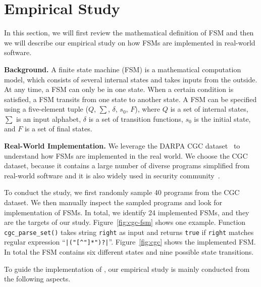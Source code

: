 \section{Empirical Study}
\label{sec:study}
In this section, we will first review the mathematical definition of FSM and then
we will describe our empirical study on how FSMs are implemented 
in real-world software. 

\noindent\textbf{Background.}
A finite state machine (FSM) is a mathematical computation model, 
which consists of several internal states and takes inputs from the outside.
At any time, a FSM can only be in one state. 
When a certain condition is satisfied, 
a FSM transits from one state to another state. 
A FSM can be specified using a five-element tuple ($Q$, $\sum$, $\delta$, $s_0$, $F$),
where $Q$ is a set of internal states, $\sum$ is an input alphabet, 
$\delta$ is a set of transition functions,
$s_0$ is the initial state, and $F$ is a set of final states. 

\noindent\textbf{Real-World Implementation.}
We leverage the DARPA CGC dataset~\cite{CGC} to 
understand how FSMs are implemented in the real world. 
We choose the CGC dataset, because it 
contains a large number of diverse programs simplified 
from real-world software and it 
is also widely used in security 
community~\cite{QSYM, Driller, VUzzer}. 


To conduct the study, we first randomly sample 
40 programs from the CGC dataset.
We then manually inspect the sampled programs and look for implementation of FSMs.
In total, we identify 24 implemented FSMs, 
and they are the targets of our study.
Figure~\ref{fig:cgc-fsm} shows one example.
Function \texttt{cgc\_parse\_set()} takes string \texttt{right} 
as input and returns \texttt{true} if \texttt{right} matches 
regular expression ``\verb/|("[^"]*")?|/''. 
Figure~\ref{fig:cgc} shows the implemented FSM. 
In total the FSM contains six different states 
and nine possible state transitions. 







To guide the implementation of \Tool{}, our empirical study 
is mainly conducted from the following aspects.


